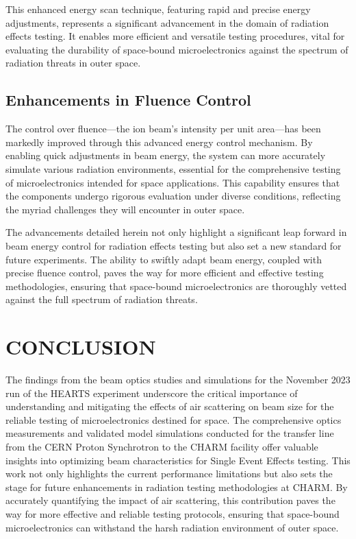 \documentclass[a4paper,
               ]{jacow}
\begin{document}
This enhanced energy scan technique, featuring rapid and precise energy adjustments, represents a significant advancement in the domain of radiation effects testing. It enables more efficient and versatile testing procedures, vital for evaluating the durability of space-bound microelectronics against the spectrum of radiation threats in outer space.

\subsection{Enhancements in Fluence Control}
The control over fluence—the ion beam's intensity per unit area—has been markedly improved through this advanced energy control mechanism. By enabling quick adjustments in beam energy, the system can more accurately simulate various radiation environments, essential for the comprehensive testing of microelectronics intended for space applications. This capability ensures that the components undergo rigorous evaluation under diverse conditions, reflecting the myriad challenges they will encounter in outer space.

The advancements detailed herein not only highlight a significant leap forward in beam energy control for radiation effects testing but also set a new standard for future experiments. The ability to swiftly adapt beam energy, coupled with precise fluence control, paves the way for more efficient and effective testing methodologies, ensuring that space-bound microelectronics are thoroughly vetted against the full spectrum of radiation threats.



\section{CONCLUSION}

The findings from the beam optics studies and simulations for the November 2023 run of the HEARTS experiment underscore the critical importance of understanding and mitigating the effects of air scattering on beam size for the reliable testing of microelectronics destined for space. The comprehensive optics measurements and validated model simulations conducted for the transfer line from the CERN Proton Synchrotron to the CHARM facility offer valuable insights into optimizing beam characteristics for Single Event Effects testing. This work not only highlights the current performance limitations but also sets the stage for future enhancements in radiation testing methodologies at CHARM. By accurately quantifying the impact of air scattering, this contribution paves the way for more effective and reliable testing protocols, ensuring that space-bound microelectronics can withstand the harsh radiation environment of outer space.
\end{document}
